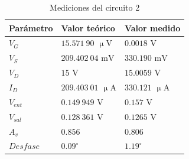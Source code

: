 \documentclass[journal]{IEEEtran}
\begin{document}
\begin{table}[H]
        \renewcommand{\arraystretch}{1.5}
        \caption{Mediciones del circuito 2}
        \centering
        \begin{tabular}{ >{\centering\arraybackslash}m{2.5cm} >{\centering\arraybackslash}m{2.5cm} >{\centering\arraybackslash}m{2.5cm} }
                \hline
            Parámetro & Valor teórico & Valor medido\\ 
            \hline
            $V_G$ & $15.571~90$ $\upmu\mathrm{V}$ & $0.0018$ $\mathrm{V}$ \\
            $V_S$ & $209.402~04$ $\mathrm{mV}$ & $330.190$ $\mathrm{mV}$ \\
            $V_D$ & $15$ $\mathrm{V}$ & $15.0059$ $\mathrm{V}$ \\
            $I_D$ & $209.403~01$ $\upmu\mathrm{A}$ & $330.121$ $\upmu\mathrm{A}$ \\
            $V_{ent}$ & $0.149~949$ $\mathrm{V}$ & $0.157$ $\mathrm{V}$ \\ 
            $V_{sal}$ & $0.128~361$ $\mathrm{V}$ & $0.1265$ $\mathrm{V}$ \\
            $A_v$ & $0.856$ & $0.806$ \\
            $Desfase$ & $0.09^{\circ}$  & $1.19^{\circ}$ \\
            \hline
        \end{tabular}
        \label{tabla7}
    \end{table}
\end{document}
